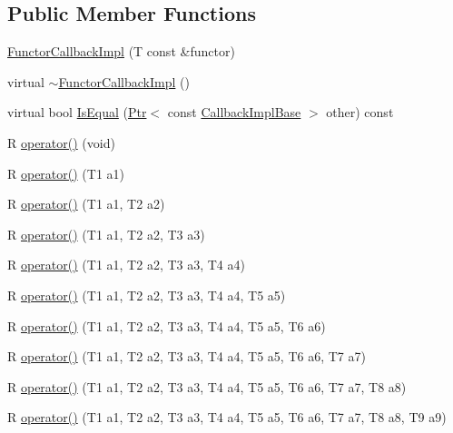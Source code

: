 \subsection*{Public Member Functions}
\begin{DoxyCompactItemize}
\item 
\hyperlink{classns3_1_1FunctorCallbackImpl_ace813c7d2394470bfbd54d8da1b037b3}{Functor\+Callback\+Impl} (T const \&functor)
\item 
virtual \hyperlink{classns3_1_1FunctorCallbackImpl_aca6871df63ebf27f11887c367b4b78ab}{$\sim$\+Functor\+Callback\+Impl} ()
\item 
virtual bool \hyperlink{classns3_1_1FunctorCallbackImpl_acfe2411ff147b4b342296daf9bad9e4a}{Is\+Equal} (\hyperlink{classns3_1_1Ptr}{Ptr}$<$ const \hyperlink{classns3_1_1CallbackImplBase}{Callback\+Impl\+Base} $>$ other) const 
\end{DoxyCompactItemize}
{\bf }\par
\begin{DoxyCompactItemize}
\item 
R \hyperlink{classns3_1_1FunctorCallbackImpl_a7bed6507aaf595a612337c49b0a15fb1}{operator()} (void)
\item 
R \hyperlink{classns3_1_1FunctorCallbackImpl_a4cc918168f80f45f743aa1792c410953}{operator()} (T1 a1)
\item 
R \hyperlink{classns3_1_1FunctorCallbackImpl_ac77df1134af0ce5b092ceffac29f1ad9}{operator()} (T1 a1, T2 a2)
\item 
R \hyperlink{classns3_1_1FunctorCallbackImpl_a271db30edbee90c07416f946a0b005f8}{operator()} (T1 a1, T2 a2, T3 a3)
\item 
R \hyperlink{classns3_1_1FunctorCallbackImpl_a9bbd2a66d5c6a5a69a82741f7ae3105e}{operator()} (T1 a1, T2 a2, T3 a3, T4 a4)
\item 
R \hyperlink{classns3_1_1FunctorCallbackImpl_a88ba172aa8591209bf8729d0fbfafb2a}{operator()} (T1 a1, T2 a2, T3 a3, T4 a4, T5 a5)
\item 
R \hyperlink{classns3_1_1FunctorCallbackImpl_a0e5d325bc6fc0a68f3bd8896bf9f4823}{operator()} (T1 a1, T2 a2, T3 a3, T4 a4, T5 a5, T6 a6)
\item 
R \hyperlink{classns3_1_1FunctorCallbackImpl_a6f7036bf8e4923320f20a154028cddf7}{operator()} (T1 a1, T2 a2, T3 a3, T4 a4, T5 a5, T6 a6, T7 a7)
\item 
R \hyperlink{classns3_1_1FunctorCallbackImpl_a070048bb823891f0fb452458329a8332}{operator()} (T1 a1, T2 a2, T3 a3, T4 a4, T5 a5, T6 a6, T7 a7, T8 a8)
\item 
R \hyperlink{classns3_1_1FunctorCallbackImpl_a8c1e9fe8409d82a9b4b8719e6f87f2cc}{operator()} (T1 a1, T2 a2, T3 a3, T4 a4, T5 a5, T6 a6, T7 a7, T8 a8, T9 a9)
\end{DoxyCompactItemize}

